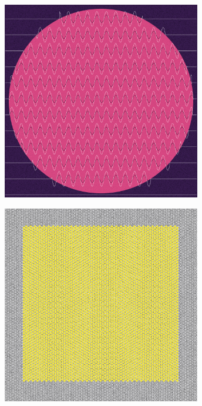 \documentclass[11pt,twoside]{book}
\begin{document}
\begin{figure}[!ht]
\includegraphics[width=246pt]{hot-dusk-094433e2-f155-4134-9677-debcb43cf986.png}
\end{figure}
\newpage
{}
\fancyfoot[CE,CO]{\fontsize{10}{12}\selectfont \thepage}
\begin{figure}[!ht]
\includegraphics[width=246pt]{salmon-lemon-61f4112a-d5df-40b5-a7c2-6a9c0161d3a6.png}
\end{figure}
\newpage
{}
\fancyfoot[CE,CO]{\fontsize{10}{12}\selectfont \thepage}
\end{document}
